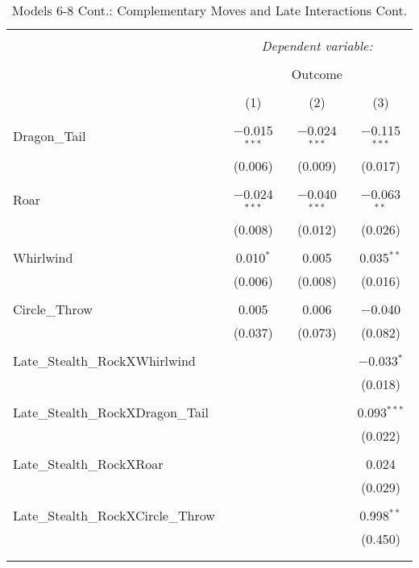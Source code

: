 \documentclass[12pt,twoside]{reedthesis}
\begin{document}
  \begin{table}[!htbp] \centering 
    \caption{Models 6-8 Cont.: Complementary Moves and Late Interactions Cont.} 
    \label{} 
  \begin{tabular}{@{\extracolsep{5pt}}lccc} 
  \\[-1.8ex]\hline 
  \hline \\[-1.8ex] 
   & \multicolumn{3}{c}{\textit{Dependent variable:}} \\ 
  \cline{2-4} 
  \\[-1.8ex] & \multicolumn{3}{c}{Outcome} \\ 
  \\[-1.8ex] & (1) & (2) & (3)\\ 
  \hline \\[-1.8ex] 
   Dragon\_Tail & $-$0.015$^{***}$ & $-$0.024$^{***}$ & $-$0.115$^{***}$ \\ 
    & (0.006) & (0.009) & (0.017) \\ 
    & & & \\ 
   Roar & $-$0.024$^{***}$ & $-$0.040$^{***}$ & $-$0.063$^{**}$ \\ 
    & (0.008) & (0.012) & (0.026) \\ 
    & & & \\ 
   Whirlwind & 0.010$^{*}$ & 0.005 & 0.035$^{**}$ \\ 
    & (0.006) & (0.008) & (0.016) \\ 
    & & & \\ 
   Circle\_Throw & 0.005 & 0.006 & $-$0.040 \\ 
    & (0.037) & (0.073) & (0.082) \\ 
    & & & \\ 
   Late\_Stealth\_RockXWhirlwind &  &  & $-$0.033$^{*}$ \\ 
    &  &  & (0.018) \\ 
    & & & \\ 
   Late\_Stealth\_RockXDragon\_Tail &  &  & 0.093$^{***}$ \\ 
    &  &  & (0.022) \\ 
    & & & \\ 
   Late\_Stealth\_RockXRoar &  &  & 0.024 \\ 
    &  &  & (0.029) \\ 
    & & & \\ 
   Late\_Stealth\_RockXCircle\_Throw &  &  & 0.998$^{**}$ \\ 
    &  &  & (0.450) \\ 
    & & & \\ 
  \hline \\[-1.8ex] 

\end{tabular}
\end{table}
\end{document}
